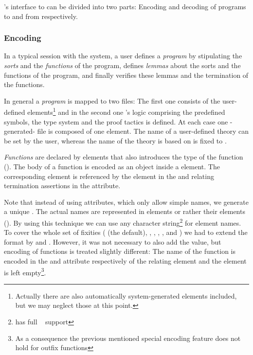 {\verifun}'s interface to {\omdoc} can be divided into two parts: Encoding and decoding of
{\verifun} programs to and from {\omdoc} respectively.

\subsubsection{Encoding}

In a typical session with the system, a user defines a {\emph{program}} by stipulating the
{\emph{sorts}} and the {\emph{functions}} of the program, defines {\emph{lemmas}} about
the sorts and the functions of the program, and finally verifies these lemmas and the
termination of the functions.

In general a {\emph{program}} is mapped to two {\omdoc} files: The first one consists of
the user-defined elements\footnote{Actually there are also automatically system-generated
  elements included, but we may neglect those at this point.} and in the second one
{\mbox{{\verifun}'s}} logic comprising the predefined symbols, the type system and the
proof tactics is defined. At each case one {\verifun}-generated-{\omdoc} file is composed
of one {} element. The name of a user-defined theory can be set by the
user, whereas the name of the theory {\mbox{\verifun}} is based on is fixed to
{}.

{\emph{Functions}} are declared by {} elements that also introduces the
type of the function ().  The body of a function is encoded as an
{\openmath} object inside a {} element. The corresponding
{} element is referenced by the {} element in the
{} and relating termination assertions in the
{} attribute.

Note that instead of using {} attributes, which only allow {\xml}
simple names, we generate a unique {}. The actual {\verifun} names are represented
in {} elements or rather their {} elements
(). By using this technique we can use any character
string\footnote{{\verifun} has full {\unicode}~\cite{Unicode:tuc03} support} for element
names. To cover the whole set of {\verifun} fixities
({} (the default),
{}, {},
{}, {}, and
{}) we had to extend the {\omdoc} format by
{} and
{}. However, it was not necessary to also add the
{} value, but encoding of
{} functions is treated slightly different: The name
of the function is encoded in the {} and
{} attribute respectively of the relating
{} element and the {} element is left empty\footnote{As
  a consequence the previous mentioned special encoding feature does not hold for outfix
  functions}.

